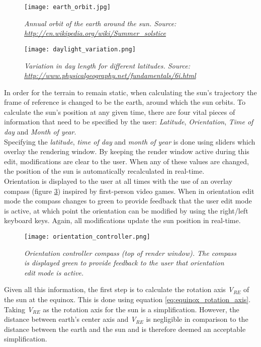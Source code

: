 \begin{figure}
\center
	\texttt{[image: earth\_orbit.jpg]}
	\caption{ \textit{Annual orbit of the earth around the sun. Source: \protect\url{http://en.wikipedia.org/wiki/Summer_solstice}}}
	\label{fig:earth_orbit}
\end{figure}

\begin{figure}
\center
	\texttt{[image: daylight\_variation.png]}
	\caption{ \textit{Variation in day length for different latitudes. Source: \protect\url{http://www.physicalgeography.net/fundamentals/6i.html}}}
	\label{fig:daylight_variation}
\end{figure}

In order for the terrain to remain static, when calculating the sun's trajectory the frame of reference is changed to be the earth, around which the sun orbits. To calculate the sun's position at any given time, there are four vital pieces of information that need to be specified by the user: \textit{Latitude}, \textit{Orientation}, \textit{Time of day} and \textit{Month of year}. \\

Specifying the \textit{latitude}, \textit{time of day} and \textit{month of year} is done using sliders which overlay the rendering window. By keeping the render window active during this edit, modifications are clear to the user. When any of these values are changed, the position of the sun is automatically recalculated in real-time. \\

Orientation is displayed to the user at all times with the use of an overlay compass (figure \ref{fig:orientation_control}) inspired by first-person video games. When in orientation edit mode the compass changes to green to provide feedback that the user edit mode is active, at which point the orientation can be modified by using the right/left keyboard keys. Again, all modifications update the sun position in real-time.\\

\begin{figure}
\center
	\texttt{[image: orientation\_controller.png]}
	\caption{ \textit{Orientation controller compass (top of render window). The compass is displayed green to provide feedback to the user that orientation edit mode is active.}}
	\label{fig:orientation_control}
\end{figure}

Given all this information, the first step is to calculate the rotation axis \textit{V$_{RE}$} of the sun at the equinox. This is done using equation \ref{eq:equinox_rotation_axis}. Taking \textit{V$_{RE}$} as the rotation axis for the sun is a simplification. However, the distance between earth's center axis and \textit{V$_{RE}$} is negligible in comparison to the distance between the earth and the sun and is therefore deemed an acceptable simplification.\\

